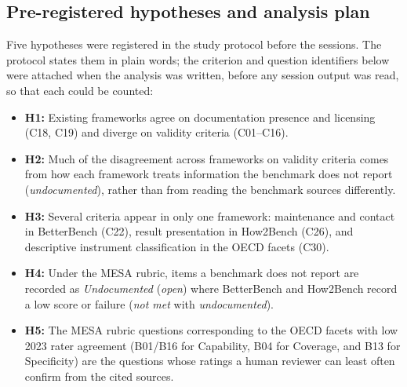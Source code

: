 \documentclass[10pt,conference]{IEEEtran}
\begin{document}
\subsection{Pre-registered hypotheses and analysis plan}
Five hypotheses were registered in the study protocol before the sessions. The protocol states them in plain words; the criterion and question identifiers below were attached when the analysis was written, before any session output was read, so that each could be counted:
\begin{itemize}
\item \textbf{H1:} Existing frameworks agree on documentation presence and licensing (C18, C19) and diverge on validity criteria (C01--C16).
\item \textbf{H2:} Much of the disagreement across frameworks on validity criteria comes from how each framework treats information the benchmark does not report (\emph{undocumented}), rather than from reading the benchmark sources differently.
\item \textbf{H3:} Several criteria appear in only one framework: maintenance and contact in BetterBench (C22), result presentation in How2Bench (C26), and descriptive instrument classification in the OECD facets (C30).
\item \textbf{H4:} Under the MESA rubric, items a benchmark does not report are recorded as \emph{Undocumented} (\emph{open}) where BetterBench and How2Bench record a low score or failure (\emph{not met} with \emph{undocumented}).
\item \textbf{H5:} The MESA rubric questions corresponding to the OECD facets with low 2023 rater agreement (B01/B16 for Capability, B04 for Coverage, and B13 for Specificity) are the questions whose ratings a human reviewer can least often confirm from the cited sources.
\end{itemize}
\end{document}
